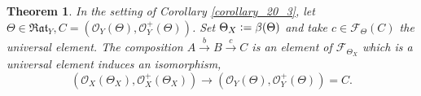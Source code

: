 \documentclass[8pt]{article}
\numberwithin{equation}{section}
\newtheorem{theorem}{Theorem} [subsection]
\newcommand{\defeq}{\vcentcolon=}
\newcommand{\Ouv}{\mathscr{O}}
\newcommand{\cR}[0]{\mathcal{R}}
\newcommand{\cF}[0]{\mathcal{F}}
\newcommand{\dcirc}[0]{{\circ\circ}}
\newcommand{\Rat}[0]{\mathfrak{Rat}}
\begin{document}
\begin{theorem}
    In the setting of Corollary \ref{corollary_20_3}, let $\Theta\in\Rat_Y,C = (\Ouv_Y(\Theta),\Ouv_Y^+(\Theta))$. Set $\Theta_X\defeq \beta(\Theta)$ and take $c\in\mathcal{F}_\Theta(C)$ the universal element. The composition $A\stackrel{b}{\to}B\stackrel{c}{\to}C$ is an element of $\cF_{\Theta_X}$ which is a universal element induces an isomorphism, %
        \begin{equation*}
            (\Ouv_X(\Theta_X),\Ouv_{X}^+(\Theta_X))\to(\Ouv_Y(\Theta),\Ouv_Y^+(\Theta))=C.
        \end{equation*}
        \label{theorem_21_2}
\end{theorem}
\end{document}
